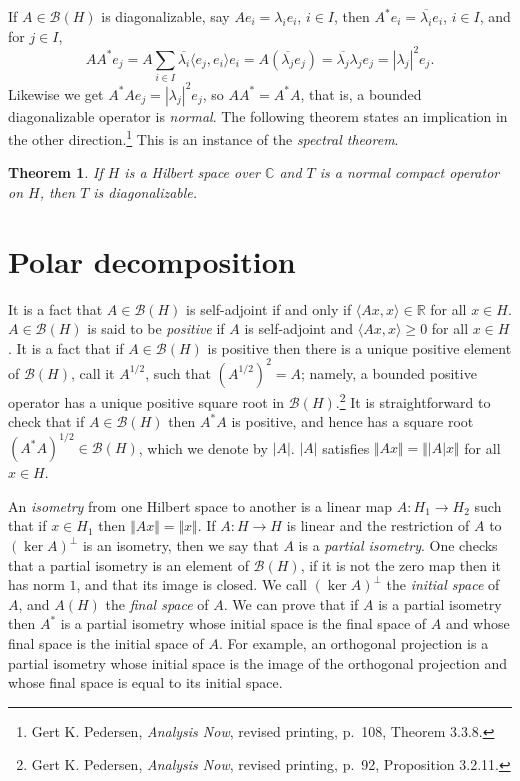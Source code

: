 \documentclass{article}
\newcommand{\inner}[2]{\langle #1, #2 \rangle}
\newcommand{\norm}[1]{\Vert #1 \Vert}
\newtheorem{theorem}{Theorem}
\begin{document}
If $A \in \mathscr{B}(H)$ is diagonalizable, say $Ae_i = \lambda_i e_i$, $i \in I$, then $A^*e_i = \overline{\lambda_i} e_i$, $i \in I$, and for $j \in I$,
\[
AA^*e_j=A\sum_{i \in I} \overline{\lambda_i} \inner{e_j}{e_i} e_i
=A \left( \overline{\lambda_j} e_j \right)= \overline{\lambda_j} \lambda_j e_j = |\lambda_j|^2 e_j.
\]
Likewise we get $A^*Ae_j=|\lambda_j|^2 e_j$, so $AA^*=A^*A$, that is, a bounded diagonalizable operator is  {\em normal}.
The following theorem states an implication in the other direction.\footnote{Gert K. Pedersen, {\em Analysis Now}, revised printing, p.~108, Theorem 3.3.8.}
This is an instance of the {\em spectral theorem}.

\begin{theorem}
If $H$ is a Hilbert space over $\mathbb{C}$ and $T$ is a normal compact operator on $H$, then $T$ is diagonalizable.
\label{spectraltheorem}
\end{theorem}





\section{Polar decomposition}
It is a fact that
$A \in \mathscr{B}(H)$ is self-adjoint if and only if
 $\inner{Ax}{x} \in \mathbb{R}$ for all $x \in H$.
$A \in \mathscr{B}(H)$ is said to be {\em positive} if $A$ is self-adjoint and $\inner{Ax}{x} \geq 0$ for all $x \in H$.
It is a fact that if $A \in \mathscr{B}(H)$ is positive then there is a unique positive element of $\mathscr{B}(H)$, call it $A^{1/2}$, such that
$(A^{1/2})^2=A$; namely, a bounded positive operator has a unique positive square root in $\mathscr{B}(H)$.\footnote{Gert K. Pedersen, {\em Analysis Now}, revised printing, p.~92, Proposition 3.2.11.}
It is straightforward to check that if $A \in \mathscr{B}(H)$ then $A^*A$  is positive, and hence has a square root $(A^*A)^{1/2} \in \mathscr{B}(H)$, which we denote
by $|A|$. $|A|$ satisfies $\norm{Ax}=\norm{|A|x}$ for all $x \in H$. 


An {\em isometry} from one Hilbert space to another is a linear map $A:H_1 \to H_2$ such that if $x \in H_1$ then $\norm{Ax}=\norm{x}$. 
If $A:H \to H $ is linear and the restriction of $A$ to $(\ker A)^\perp$ is an isometry, then we say that $A$ is a {\em partial isometry}.
One checks that a partial isometry is an element
of $\mathscr{B}(H)$,  if it is not the zero map then it has norm $1$, and that its image is closed.
We call
$(\ker A)^\perp$ the {\em initial space} of $A$, and $A(H)$ the {\em final space} of $A$. We can prove that
if $A$ is a partial isometry then $A^*$ is a partial isometry whose initial space is the final space
of $A$ and whose final space is the initial space of $A$.
For example, an orthogonal projection is a partial isometry whose initial space is the image of the orthogonal projection and whose final
space is equal to its initial space.
\end{document}
